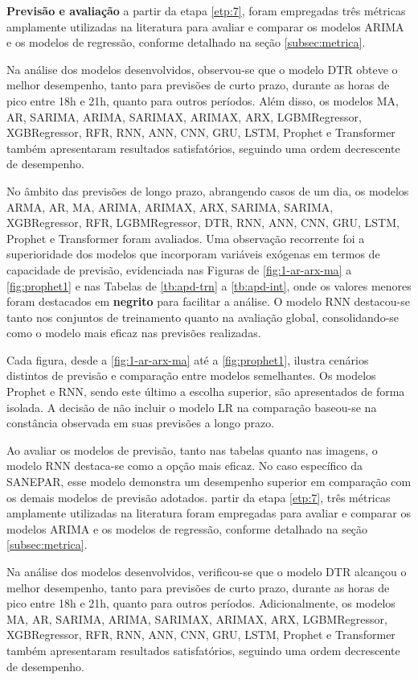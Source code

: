 \textbf{Previs\~ao e avalia\c c\~ao}
a partir da etapa \ref{etp:7}, foram empregadas três métricas amplamente utilizadas na literatura para avaliar e comparar os modelos ARIMA e os modelos de regressão, conforme detalhado na seção \ref{subsec:metrica}.

Na análise dos modelos desenvolvidos, observou-se que o modelo DTR obteve o melhor desempenho, tanto para previsões de curto prazo, durante as horas de pico entre 18h e 21h, quanto para outros períodos. Além disso, os modelos MA, AR, SARIMA, ARIMA, SARIMAX, ARIMAX, ARX, LGBMRegressor, XGBRegressor, RFR, RNN, ANN, CNN, GRU, LSTM, Prophet e Transformer também apresentaram resultados satisfatórios, seguindo uma ordem decrescente de desempenho.

No âmbito das previsões de longo prazo, abrangendo casos de um dia, os modelos ARMA, AR, MA, ARIMA, ARIMAX, ARX, SARIMA, SARIMA, XGBRegressor, RFR, LGBMRegressor, DTR, RNN, ANN, CNN, GRU, LSTM, Prophet e Transformer foram avaliados. Uma observação recorrente foi a superioridade dos modelos que incorporam variáveis exógenas em termos de capacidade de previsão, evidenciada nas Figuras de \ref{fig:1-ar-arx-ma} a \ref{fig:prophet1} e nas Tabelas de \ref{tb:apd-trn} a \ref{tb:apd-int}, onde os valores menores foram destacados em \textbf{negrito} para facilitar a análise. O modelo RNN destacou-se tanto nos conjuntos de treinamento quanto na avaliação global, consolidando-se como o modelo mais eficaz nas previsões realizadas.

Cada figura, desde a \ref{fig:1-ar-arx-ma} até a \ref{fig:prophet1}, ilustra cenários distintos de previsão e comparação entre modelos semelhantes. Os modelos Prophet e RNN, sendo este último a escolha superior, são apresentados de forma isolada. A decisão de não incluir o modelo LR na comparação baseou-se na constância observada em suas previsões a longo prazo.

Ao avaliar os modelos de previsão, tanto nas tabelas quanto nas imagens, o modelo RNN destaca-se como a opção mais eficaz. No caso específico da SANEPAR, esse modelo demonstra um desempenho superior em comparação com os demais modelos de previsão adotados. partir da etapa \ref{etp:7}, três métricas amplamente utilizadas na literatura foram empregadas para avaliar e comparar os modelos ARIMA e os modelos de regressão, conforme detalhado na seção \ref{subsec:metrica}.

Na análise dos modelos desenvolvidos, verificou-se que o modelo DTR alcançou o melhor desempenho, tanto para previsões de curto prazo, durante as horas de pico entre 18h e 21h, quanto para outros períodos. Adicionalmente, os modelos MA, AR, SARIMA, ARIMA, SARIMAX, ARIMAX, ARX, LGBMRegressor, XGBRegressor, RFR, RNN, ANN, CNN, GRU, LSTM, Prophet e Transformer também apresentaram resultados satisfatórios, seguindo uma ordem decrescente de desempenho.

